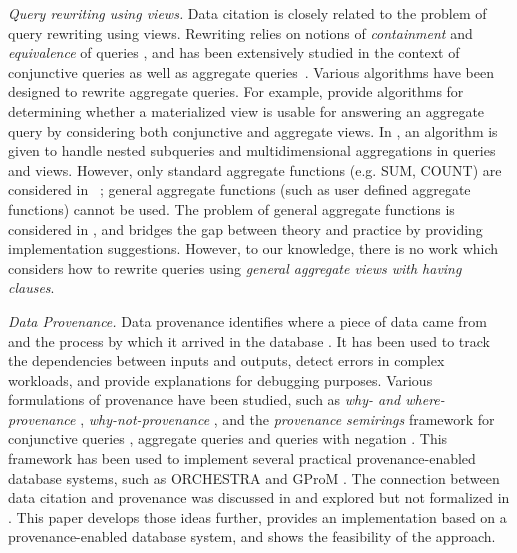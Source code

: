 {\em Query rewriting using views.} %
Data citation is closely related to the problem of query rewriting using views.
Rewriting relies on notions of {\em containment} and {\em equivalence} of queries \cite{halevy2001answering}, and has been extensively studied 
in the context of conjunctive queries \cite{chandra1977optimal, chaudhuri1995optimizing, pottinger2000scalable, afrati2007using} as well as aggregate queries~\cite{cohen2007deciding, cohen1999rewriting}. 
Various algorithms have been designed to rewrite aggregate queries.
For example, \cite{srivastava1996answering, galindo2001orthogonal} provide algorithms for determining whether a materialized view is usable for answering an aggregate query by considering both conjunctive and aggregate views.
In \cite{zaharioudakis2000answering}, an algorithm is given to handle nested subqueries and multidimensional aggregations in queries and views. However, only standard aggregate functions (e.g. SUM, COUNT) are considered in ~\cite{zaharioudakis2000answering, srivastava1996answering, galindo2001orthogonal}; general aggregate functions (such as
user defined aggregate functions) cannot be used. The problem of general aggregate functions is considered in \cite{cohen2006rewriting}, and \cite{cohen2006user} bridges the gap between theory and practice by providing  implementation suggestions. However, to our knowledge, there is no work which considers how to rewrite queries using \textit{general aggregate views with having clauses}.

{\em Data Provenance.} Data provenance identifies where a piece of data came from and the process by which it arrived in the database \cite{buneman2001and}.  It has been used to track the dependencies between inputs and outputs, detect errors in complex workloads, and provide explanations for debugging purposes. Various formulations of provenance have been studied, such as \textit{why- and where-provenance} \cite{buneman2001and}, \textit{why-not-provenance} \cite{chapman2009not}, and the \textit{provenance semirings} framework %
for conjunctive queries \cite{green2007provenance}, aggregate queries \cite{amsterdamer2011provenance} and queries with negation \cite{xu2018provenance}.  This framework has been used to implement several practical provenance-enabled database systems, such as ORCHESTRA \cite{ives2008orchestra} and GProM \cite{arab2018gprom}. The connection between data citation and provenance was discussed in \cite{BunemanEtAl2016} and explored but not formalized in \cite{alawini2018data}. This paper develops those ideas further, provides an implementation based on a provenance-enabled database system, and shows the feasibility of the approach.

